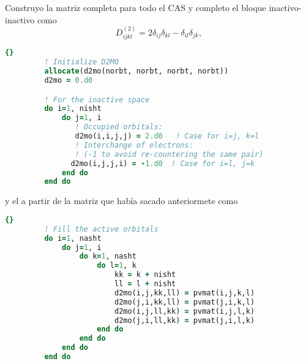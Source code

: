 Construyo la matriz completa para todo el CAS y completo el bloque inactivo-inactivo
como 
\begin{equation}
    D_{ijkl}^{(2)} = 2 \delta_{ij}  \delta_{kl} - \delta_{il} \delta_{jk}
    ,
\end{equation}
\begin{lstlisting}[language=fortran]{}
         ! Initialize D2MO
         allocate(d2mo(norbt, norbt, norbt, norbt))
         d2mo = 0.d0

         ! For the inactive space
         do i=1, nisht
             do j=1, i
                ! Occupied orbitals:
                d2mo(i,i,j,j) = 2.d0   ! Case for i=j, k=l
                ! Interchange of electrons:
                ! (-1 to avoid re-countering the same pair)
               d2mo(i,j,j,i) = -1.d0  ! Case for i=l, j=k
             end do
         end do
\end{lstlisting}
y el  a partir de la matriz que había sacado anteriormete como
\begin{lstlisting}[language=fortran]{}
         ! Fill the active orbitals
         do i=1, nasht
             do j=1, i
                 do k=1, nasht
                     do l=1, k
                         kk = k + nisht
                         ll = l + nisht
                         d2mo(i,j,kk,ll) = pvmat(i,j,k,l)
                         d2mo(j,i,kk,ll) = pvmat(j,i,k,l)
                         d2mo(i,j,ll,kk) = pvmat(i,j,l,k)
                         d2mo(j,i,ll,kk) = pvmat(j,i,l,k)
                     end do
                 end do
             end do
         end do
\end{lstlisting}

